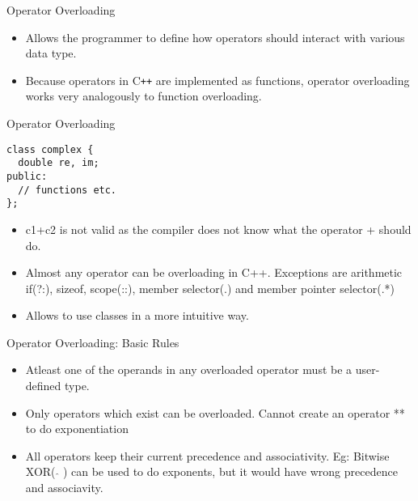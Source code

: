 \documentclass{beamer}
\begin{document}
\begin{frame}[fragile]{Operator Overloading}
  \begin{itemize}
    \item Allows the programmer to define how operators should interact with various data type.\pause
    \item Because operators in C\texttt{++} are implemented as functions, operator overloading works very analogously to function overloading.
  \end{itemize}
\end{frame}

\begin{frame}[fragile]{Operator Overloading}
  \begin{lstlisting}
class complex {
  double re, im;
public:
  // functions etc.
};
  \end{lstlisting}\pause
  \begin{itemize}
    \item c1+c2 is not valid as the compiler does not know what the operator + should do.\pause
    \item Almost any operator can be overloading in C++. Exceptions are arithmetic if(?:), sizeof, scope(::), member selector(.) and member pointer selector(.*)\pause
    \item Allows to use classes in a more intuitive way.
  \end{itemize}
\end{frame}

\begin{frame}[fragile]{Operator Overloading: Basic Rules}
  \begin{itemize}
  \item Atleast one of the operands in any overloaded operator must be a user-defined type.\pause
  \item Only operators which exist can be overloaded. Cannot create an operator ** to do exponentiation\pause
  \item All operators keep their current precedence and associativity. Eg: Bitwise XOR( $\hat{ }$ ) can be used to do exponents, but it would have wrong precedence and associavity.
  \end{itemize}
\end{frame}
\end{document}
